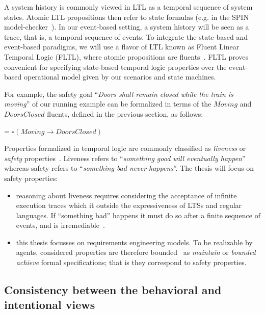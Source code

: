 A system history is commonly viewed in LTL as a temporal sequence of system states. Atomic LTL propositions then refer to state formulas (e.g. in the SPIN model-checker~\cite{Holzmann:1997}). In our event-based setting, a system history will be seen as a trace, that is, a temporal sequence of events. To integrate the state-based and event-based paradigms, we will use a flavor of LTL known as Fluent Linear Temporal Logic (FLTL), where atomic propositions are fluents~\cite{Giannakopoulou:2003}. FLTL proves convenient for specifying state-based temporal logic properties over the event-based operational model given by our scenarios and state machines. 

For example, the safety goal ``\emph{Doors shall remain closed while the train is moving}'' of our running example can be formalized in terms of the $Moving$ and $DoorsClosed$ fluents, defined in the previous section, as follows:

\begin{center}
 = $\square(Moving \rightarrow DoorsClosed)$
\end{center}

Properties formalized in temporal logic are commonly classified as \emph{liveness} or \emph{safety} properties~\cite{Alpern:1986}. Liveness refers to ``\emph{something good will eventually happen}'' whereas safety refers to  ``\emph{something bad never happens}''. The thesis will focus on safety properties:

\begin{itemize}
\item reasoning about liveness requires considering the acceptance of infinite execution traces which it outside the expressiveness of LTSs and regular languages. If ``something bad'' happens it must do so after a finite sequence of events, and is irremediable~\cite{Alpern:1986, Giannakopoulou:1999}.
\item this thesis focusses on requirements engineering models. To be realizable by agents, considered properties are therefore bounded~\cite{Letier:2002} as \emph{maintain} or \emph{bounded achieve} formal specifications; that is they correspond to safety properties.  
\end{itemize}

\subsection{Consistency between the behavioral and intentional views\label{subsection:background-goals-consistency}}


